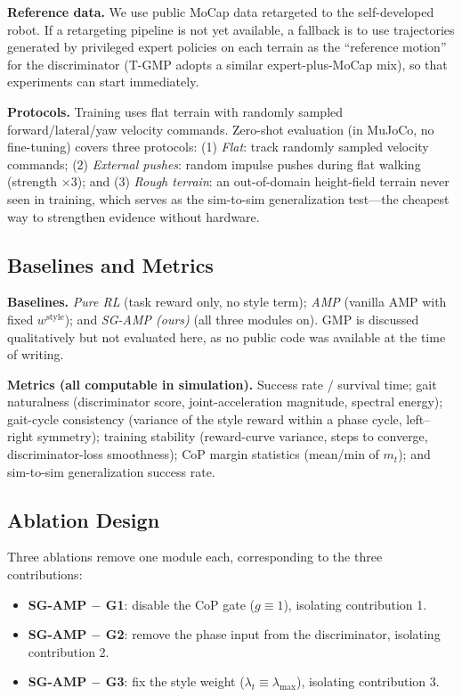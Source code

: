 \documentclass[conference]{IEEEtran}
\begin{document}
\textbf{Reference data.} We use public MoCap data retargeted to the self-developed robot. If a retargeting pipeline is not yet available, a fallback is to use trajectories generated by privileged expert policies on each terrain as the ``reference motion'' for the discriminator (T-GMP \cite{guo2026tgmp} adopts a similar expert-plus-MoCap mix), so that experiments can start immediately.

\textbf{Protocols.} Training uses flat terrain with randomly sampled forward/lateral/yaw velocity commands. Zero-shot evaluation (in MuJoCo, no fine-tuning) covers three protocols: (1) \emph{Flat}: track randomly sampled velocity commands; (2) \emph{External pushes}: random impulse pushes during flat walking (strength $\times3$); and (3) \emph{Rough terrain}: an out-of-domain height-field terrain never seen in training, which serves as the sim-to-sim generalization test---the cheapest way to strengthen evidence without hardware.

\subsection{Baselines and Metrics}

\textbf{Baselines.} \emph{Pure RL} (task reward only, no style term); \emph{AMP} \cite{peng2021amp} (vanilla AMP with fixed $w^{\mathrm{style}}$); and \emph{SG-AMP (ours)} (all three modules on). GMP \cite{zhang2025gmp} is discussed qualitatively but not evaluated here, as no public code was available at the time of writing.

\textbf{Metrics (all computable in simulation).} Success rate / survival time; gait naturalness (discriminator score, joint-acceleration magnitude, spectral energy); gait-cycle consistency (variance of the style reward within a phase cycle, left--right symmetry); training stability (reward-curve variance, steps to converge, discriminator-loss smoothness); CoP margin statistics (mean/min of $m_t$); and sim-to-sim generalization success rate.

\subsection{Ablation Design}
Three ablations remove one module each, corresponding to the three contributions:

\begin{itemize}
    \item \textbf{SG-AMP $-$ G1}: disable the CoP gate ($g\equiv 1$), isolating contribution 1.
    \item \textbf{SG-AMP $-$ G2}: remove the phase input from the discriminator, isolating contribution 2.
    \item \textbf{SG-AMP $-$ G3}: fix the style weight ($\lambda_t\equiv\lambda_{\max}$), isolating contribution 3.
\end{itemize}
\end{document}
